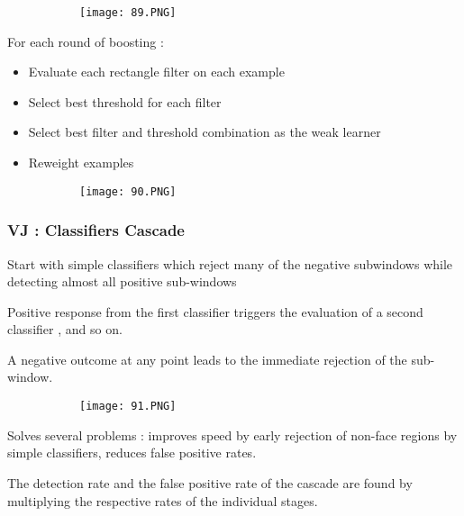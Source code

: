 \documentclass{article}
\begin{document}
\begin{figure}[ht!]
  \centering
  \begin{subfigure}[b]{0.6\linewidth}
    \texttt{[image: 89.PNG]}
  \end{subfigure}
\end{figure}

For each round of boosting :

\begin{itemize}
    \item Evaluate each rectangle filter on each example
    \item Select best threshold for each filter
    \item Select best filter and threshold combination as the weak learner
    \item Reweight examples
\end{itemize}


\begin{figure}[ht!]
  \centering
  \begin{subfigure}[b]{0.8\linewidth}
    \texttt{[image: 90.PNG]}
  \end{subfigure}
\end{figure}

\vspace{50mm}

\subsubsection{VJ : Classifiers Cascade}

Start with simple classifiers which reject many of the negative subwindows while detecting almost all positive sub-windows

Positive response from the first classifier triggers the evaluation of a second classifier , and so on.

A negative outcome at any point leads to the immediate rejection of the sub-window.

\begin{figure}[ht!]
  \centering
  \begin{subfigure}[b]{0.8\linewidth}
    \texttt{[image: 91.PNG]}
  \end{subfigure}
\end{figure}

Solves several problems : improves speed by early rejection of non-face regions by simple classifiers, reduces false positive rates.

The detection rate and the false positive rate of the cascade are found by multiplying the respective rates of the individual stages.
\end{document}
